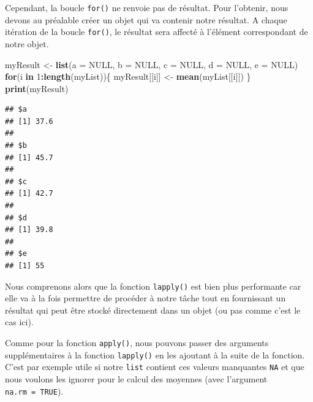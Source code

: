 \documentclass[
]{book}
\newenvironment{Shaded}{\begin{snugshade}}{\end{snugshade}}
\newcommand{\ControlFlowTok}[1]{\textcolor[rgb]{0.13,0.29,0.53}{\textbf{#1}}}
\newcommand{\DataTypeTok}[1]{\textcolor[rgb]{0.13,0.29,0.53}{#1}}
\newcommand{\DecValTok}[1]{\textcolor[rgb]{0.00,0.00,0.81}{#1}}
\newcommand{\KeywordTok}[1]{\textcolor[rgb]{0.13,0.29,0.53}{\textbf{#1}}}
\newcommand{\NormalTok}[1]{#1}
\newcommand{\OperatorTok}[1]{\textcolor[rgb]{0.81,0.36,0.00}{\textbf{#1}}}
\newcommand{\OtherTok}[1]{\textcolor[rgb]{0.56,0.35,0.01}{#1}}
\newcommand{\StringTok}[1]{\textcolor[rgb]{0.31,0.60,0.02}{#1}}
\begin{document}
Cependant, la boucle \texttt{for()} ne renvoie pas de résultat. Pour l'obtenir, nous devons au préalable créer un objet qui va contenir notre résultat. A chaque itération de la boucle \texttt{for()}, le résultat sera affecté à l'élément correspondant de notre objet.

\begin{Shaded}
\begin{Highlighting}[]
\NormalTok{myResult <-}\StringTok{ }\KeywordTok{list}\NormalTok{(}\DataTypeTok{a =} \OtherTok{NULL}\NormalTok{, }\DataTypeTok{b =} \OtherTok{NULL}\NormalTok{, }\DataTypeTok{c =} \OtherTok{NULL}\NormalTok{, }
  \DataTypeTok{d =} \OtherTok{NULL}\NormalTok{, }\DataTypeTok{e =} \OtherTok{NULL}\NormalTok{)}
\ControlFlowTok{for}\NormalTok{(i }\ControlFlowTok{in} \DecValTok{1}\OperatorTok{:}\KeywordTok{length}\NormalTok{(myList))\{}
\NormalTok{  myResult[[i]] <-}\StringTok{ }\KeywordTok{mean}\NormalTok{(myList[[i]])}
\NormalTok{\}}
\KeywordTok{print}\NormalTok{(myResult)}
\end{Highlighting}
\end{Shaded}

\begin{verbatim}
## $a
## [1] 37.6
## 
## $b
## [1] 45.7
## 
## $c
## [1] 42.7
## 
## $d
## [1] 39.8
## 
## $e
## [1] 55
\end{verbatim}

Nous comprenons alors que la fonction \texttt{lapply()} est bien plus performante car elle va à la fois permettre de procéder à notre tâche tout en fournissant un résultat qui peut être stocké directement dans un objet (ou pas comme c'est le cas ici).

Comme pour la fonction \texttt{apply()}, nous pouvons passer des arguments supplémentaires à la fonction \texttt{lapply()} en les ajoutant à la suite de la fonction. C'est par exemple utile si notre \texttt{list} contient ces valeurs manquantes \texttt{NA} et que nous voulons les ignorer pour le calcul des moyennes (avec l'argument \texttt{na.rm\ =\ TRUE}).
\end{document}
